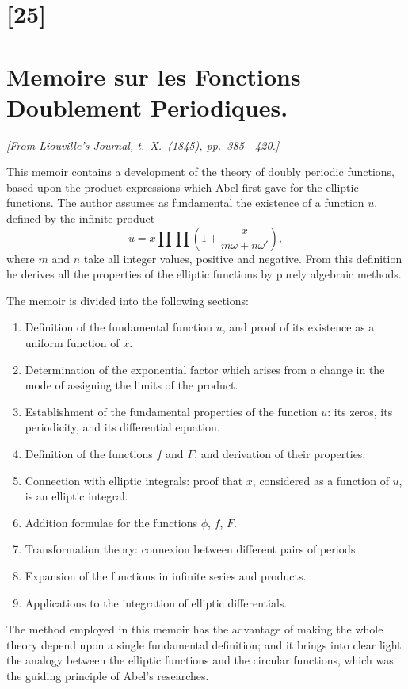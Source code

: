 \documentclass[12pt,a4paper]{article}
\begin{document}
\newpage
\section*{[25]}
\section*{Memoire sur les Fonctions Doublement Periodiques.}

\textit{[From Liouville's Journal, t.~X.~(1845), pp.~385---420.]}

\bigskip
\setcounter{page}{156}

This memoir contains a development of the theory of doubly periodic functions,
based upon the product expressions which Abel first gave for the elliptic functions.
The author assumes as fundamental the existence of a function $u$, defined by the
infinite product
\[
u = x \prod \prod \left(1 + \frac{x}{m\omega + n\omega'}\right),\]
where $m$ and $n$ take all integer values, positive and negative. From this definition he
derives all the properties of the elliptic functions by purely algebraic methods.

The memoir is divided into the following sections:
\begin{enumerate}
\item Definition of the fundamental function $u$, and proof of its existence as a
uniform function of $x$.
\item Determination of the exponential factor which arises from a change in the
mode of assigning the limits of the product.
\item Establishment of the fundamental properties of the function $u$: its zeros,
its periodicity, and its differential equation.
\item Definition of the functions $f$ and $F$, and derivation of their properties.
\item Connection with elliptic integrals: proof that $x$, considered as a function
of $u$, is an elliptic integral.
\item Addition formulae for the functions $\phi$, $f$, $F$.
\item Transformation theory: connexion between different pairs of periods.
\item Expansion of the functions in infinite series and products.
\item Applications to the integration of elliptic differentials.
\end{enumerate}

The method employed in this memoir has the advantage of making the whole theory
depend upon a single fundamental definition; and it brings into clear light the analogy
between the elliptic functions and the circular functions, which was the guiding principle
of Abel's researches.
\end{document}
